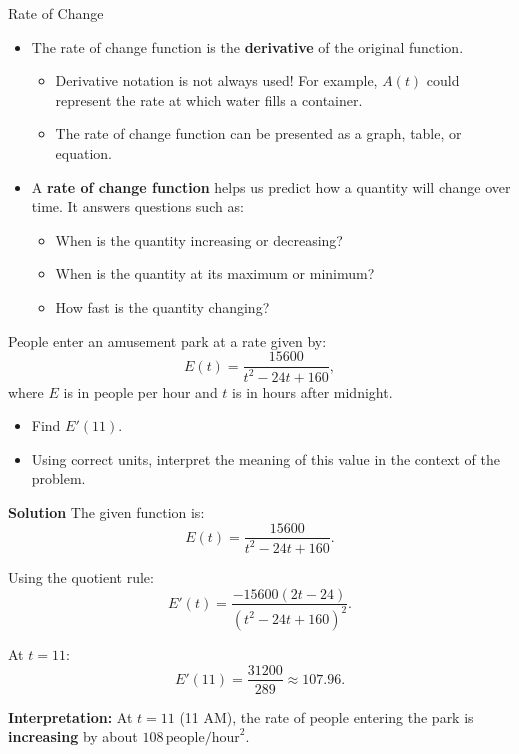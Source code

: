\documentclass[12pt]{article}
\theoremstyle{beautifulthm}
\begin{document}
\begin{Definition}{Rate of Change}{}

\begin{itemize}

    \item The rate of change function is the \textbf{derivative} of the original function.
    \begin{itemize}
        \item Derivative notation is not always used! For example, \( A(t) \) could represent the rate at which water fills a container.
        \item The rate of change function can be presented as a graph, table, or equation.
    \end{itemize}
\end{itemize}
\end{Definition}

\begin{itemize}
    \item A \textbf{rate of change function} helps us predict how a quantity will change over time. It answers questions such as:
    \begin{itemize}
        \item When is the quantity increasing or decreasing?
        \item When is the quantity at its maximum or minimum?
        \item How fast is the quantity changing?
    \end{itemize}
\end{itemize}


\begin{tcolorbox}[colback=examplebg, colframe=red!75!black, title=\textbf{EXAMPLE 1:Rates of Chang}, fonttitle=\bfseries, sharp corners]
People enter an amusement park at a rate given by:
\[
E(t) = \frac{15600}{t^2 - 24t + 160},
\]
where \( E \) is in people per hour and \( t \) is in hours after midnight. 

\begin{itemize}
    \item Find \( E'(11) \).
    \item Using correct units, interpret the meaning of this value in the context of the problem.
\end{itemize}

\tcblower
\textbf{Solution}
The given function is:
\[
E(t) = \frac{15600}{t^2 - 24t + 160}.
\]

Using the quotient rule:
\[
E'(t) = \frac{-15600(2t - 24)}{(t^2 - 24t + 160)^2}.
\]

At \( t = 11 \):
\[
E'(11) = \frac{31200}{289} \approx 107.96.
\]

\textbf{Interpretation:} At \( t = 11 \) (11 AM), the rate of people entering the park is \textbf{increasing} by about \( 108 \, \text{people/hour}^2 \).

\end{tcolorbox}
\end{document}
